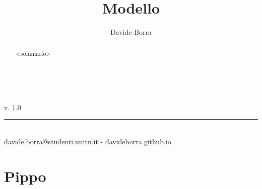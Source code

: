 \documentclass[twoside]{article}
\title{Modello}
\author{Davide Borra}
\date{}
\makeatletter
\let\runauthor\@author
\let\runtitle\@title
\makeatother
\begin{document}
\lhead{}
\chead{}
\rfoot{\runauthor}

\begin{titlepage}
    \pagestyle{empty}
    \begin{center}
        \vspace*{\fill}
        \vspace{0.5cm}
        \textbf{\Huge \runtitle}\\\vspace{5mm}
        \textsc{\Large \runauthor}
        \vspace{5cm}
    \end{center}
    \vspace*{\fill}
    v. 1.0\\
    \rule{0.8\linewidth}{0.5mm}\\
    {\footnotesize\href{mailto:davide.borra@studenti.unitn.it}{davide.borra@studenti.unitn.it} - \href{http://davideborra.github.io}{davideborra.github.io}}
    \restoregeometry\newpage
    \thispagestyle{empty}
\end{titlepage}
    \begin{abstract}
        \centering <sommario>
    \end{abstract}
    \tableofcontents
    \creativecommons
    \newpage
    
    \chead{}
    \rfoot{\runauthor}
    \fancyhead[RO]{\nouppercase{\rightmark}}
    \fancyhead[LE]{\nouppercase{\rightmark}}
    \fancyhead[RE]{\runtitle}
    \fancyhead[LO]{\runtitle}

    \section{Pippo}
\end{document}

